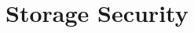 \documentclass{sig-alternate}
\begin{document}
\section{Storage Security}
\label{sec:fs}



\end{document}
